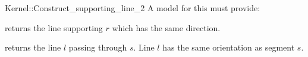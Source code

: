 \begin{ccRefFunctionObjectConcept}{Kernel::Construct_supporting_line_2}
A model for this must provide:


       {returns the line supporting $r$ which has the same direction.}

       {returns the line $l$ passing through $s$. Line $l$  has the
        same orientation as segment $s$.}

\end{ccRefFunctionObjectConcept}
